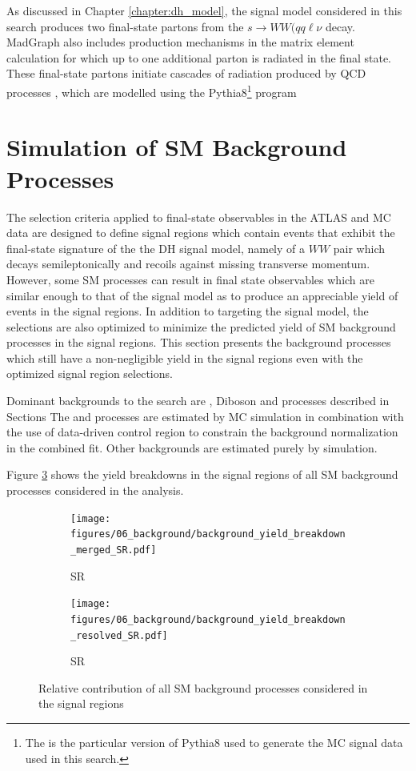 As discussed in Chapter \ref{chapter:dh_model}, the signal model considered in this search produces two final-state partons from the \(s \rightarrow WW(qq\ell\nu\) decay. MadGraph also includes production mechanisms in the matrix element calculation for which up to one additional parton is radiated in the final state. These final-state partons initiate cascades of radiation produced by QCD processes \cite{parton_shower}, which are modelled using the Pythia8\footnote{The \PYTHIA[8.230]\cite{Sjostrand:2014zea} is the particular version of Pythia8 used to generate the MC signal data used in this search.} program

\section{Simulation of SM Background Processes}
\label{sec:SM_bkg_sim}

The selection criteria applied to final-state observables in the ATLAS and MC data are designed to define signal regions which contain events that exhibit the final-state signature of the the DH signal model, namely of a \(WW\) pair which decays semileptonically and recoils against missing transverse momentum. However, some SM processes can result in final state observables which are similar enough to that of the signal model as to produce an appreciable yield of events in the signal regions. In addition to targeting the signal model, the selections are also optimized to minimize the predicted yield of SM background processes in the signal regions. This section presents the background processes which still have a non-negligible yield in the signal regions even with the optimized signal region selections.

Dominant backgrounds to the search are \Wjets, Diboson and \ttbar processes described in Sections 
The \Wjets and \ttbar processes are estimated by MC simulation in combination with the use of data-driven control region to constrain the background normalization in the combined fit.
Other backgrounds are estimated purely by simulation.

Figure \ref{fig:background_yield_breakdown} shows the yield breakdowns in the signal regions of all SM background processes considered in the analysis.

\begin{figure}[h]
  \centering
     \begin{subfigure}{0.49\textwidth}
     \texttt{[image: figures/06\_background/background\_yield\_breakdown\_merged\_SR.pdf]}
    \caption{\merged SR}
    \label{fig:background_yield_breakdown_merged_SR}
     \end{subfigure}
    \begin{subfigure}{0.49\textwidth}
     \texttt{[image: figures/06\_background/background\_yield\_breakdown\_resolved\_SR.pdf]}
     \caption{\resolved SR}
     \label{fig:background_yield_breakdown_resolved_SR}
     \end{subfigure}
     \caption{Relative contribution of all SM background processes considered in the signal regions}
     \label{fig:background_yield_breakdown}
  \end{figure}

